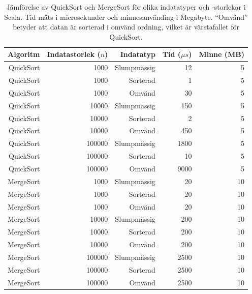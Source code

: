 \documentclass[a4paper,12pt]{article}   %
\begin{document}
\begin{table}[h]
    \centering
    \begin{tabular}{r|r|r|r|r}
        Algoritm  & Indatastorlek ($n$) & Indatatyp   & Tid ($\mu s$) & Minne (MB) \\
        \hline
        \hline
        QuickSort & 1000                & Slumpmässig & 12       & 5          \\
        QuickSort & 1000                & Sorterad    & 1        & 5          \\
        QuickSort & 1000                & Omvänd      & 30       & 5          \\
        \hline
        QuickSort & 10000               & Slumpmässig & 150      & 5          \\
        QuickSort & 10000               & Sorterad    & 2        & 5          \\
        QuickSort & 10000               & Omvänd      & 450      & 5          \\
        \hline
        QuickSort & 100000              & Slumpmässig & 1800     & 5          \\
        QuickSort & 100000              & Sorterad    & 10       & 5          \\
        QuickSort & 100000              & Omvänd      & 9000     & 5          \\
        \hline
        \hline
        MergeSort & 1000                & Slumpmässig & 20       & 10         \\
        MergeSort & 1000                & Sorterad    & 20       & 10         \\
        MergeSort & 1000                & Omvänd      & 20       & 10         \\
        \hline
        MergeSort & 10000               & Slumpmässig & 200      & 10         \\
        MergeSort & 10000               & Sorterad    & 200      & 10         \\
        MergeSort & 10000               & Omvänd      & 200      & 10         \\
        \hline
        MergeSort & 100000              & Slumpmässig & 2500     & 10         \\
        MergeSort & 100000              & Sorterad    & 2500     & 10         \\
        MergeSort & 100000              & Omvänd      & 2500     & 10         \\
        \hline
    \end{tabular}
    \caption{Jämförelse av QuickSort och MergeSort för olika indatatyper och -storlekar i Scala. Tid mäts i microsekunder och minnesanvänding i Megabyte. \enquote{Omvänd} betyder att datan är sorterad i omvänd ordning, vilket är värstafallet för QuickSort.}
    \label{tab:sorteringsalgoritmer}
\end{table}
\end{document}
